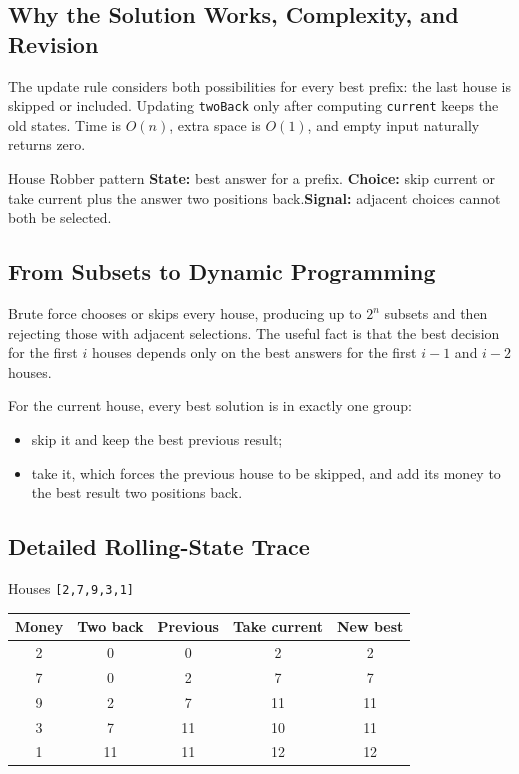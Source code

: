 \subsection{Why the Solution Works, Complexity, and Revision}
The update rule considers both possibilities for every best prefix: the last
house is skipped or included. Updating \texttt{twoBack} only after computing
\texttt{current} keeps the old states. Time is \(O(n)\), extra space is
\(O(1)\), and empty input naturally returns zero.

\begin{revisionbox}{House Robber pattern}
\textbf{State:} best answer for a prefix.\quad
\textbf{Choice:} skip current or take current plus the answer two positions
back.\quad \textbf{Signal:} adjacent choices cannot both be selected.
\end{revisionbox}

\subsection{From Subsets to Dynamic Programming}
Brute force chooses or skips every house, producing up to \(2^n\) subsets and
then rejecting those with adjacent selections. The useful fact is
that the best decision for the first \(i\) houses depends only on the best
answers for the first \(i-1\) and \(i-2\) houses.

For the current house, every best solution is in exactly one group:
\begin{itemize}
  \item skip it and keep the best previous result;
  \item take it, which forces the previous house to be skipped, and add its
  money to the best result two positions back.
\end{itemize}

\subsection{Detailed Rolling-State Trace}
\begin{dryrunbox}{Houses \texttt{[2,7,9,3,1]}}
\begin{center}
\begin{tabular}{@{}c c c c c@{}}
\toprule
Money & Two back & Previous & Take current & New best \\
\midrule
2 & 0 & 0 & 2 & 2 \\
7 & 0 & 2 & 7 & 7 \\
9 & 2 & 7 & 11 & 11 \\
3 & 7 & 11 & 10 & 11 \\
1 & 11 & 11 & 12 & 12 \\
\bottomrule
\end{tabular}
\end{center}
\end{dryrunbox}


